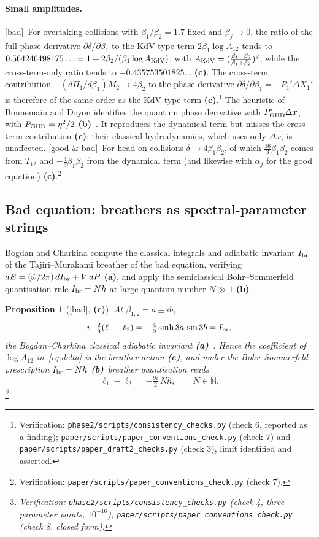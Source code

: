 \documentclass[11pt,a4paper]{article}
\newcommand{\lab}[1]{{\normalfont\sffamily\footnotesize\bfseries(#1)}}
\newcommand{\La}{\lab{a}}
\newcommand{\Lb}{\lab{b}}
\newcommand{\Lc}{\lab{c}}
\newcommand{\eqtag}[2]{{\normalfont\sffamily\footnotesize\textcolor{#1}{[#2]}}}
\newcommand{\Bad}{\eqtag{red!60!black}{bad}}
\newcommand{\Both}{\eqtag{violet!70!black}{good \& bad}}
\newcommand{\scr}[1]{\nolinkurl{#1}}
\newcommand{\chk}[1]{\footnote{\raggedright Verification: #1.}}
\newcommand{\hb}{\hbar}
\newtheorem{proposition}{Proposition}[section]
\theoremstyle{remark}
\begin{document}
\paragraph{Small amplitudes.} \Bad\ For overtaking collisions with $\beta_1/\beta_2=1.7$ fixed and $\beta_j\to0$, the ratio of the full phase derivative $\partial\delta/\partial\beta_1$ to the KdV-type term $2\beta_1\log A_{12}$ tends to $0.564246498175\ldots=1+2\beta_2/(\beta_1\log A_{\rm KdV})$, with $A_{\rm KdV}=(\frac{\beta_1-\beta_2}{\beta_1+\beta_2})^2$, while the cross-term-only ratio tends to $-0.435753501825\ldots$ \Lc. The cross-term contribution $-(d\Pi_1/d\beta_1)M_2\to4\beta_2$ to the phase derivative $\partial\delta/\partial\beta_1=-P_1'\Delta X_1'$ is therefore of the same order as the KdV-type term \Lc.\chk{\scr{phase2/scripts/consistency_checks.py} (check 6, reported as a finding); \scr{paper/scripts/paper_conventions_check.py} (check 7) and \scr{paper/scripts/paper_draft2_checks.py} (check 3), limit identified and asserted} The heuristic of Bonnemain and Doyon identifies the quantum phase derivative with $P'_{\rm GHD}\Delta x$, with $P_{\rm GHD}=\eta^2/2$ \Lb~\cite{BD}. It reproduces the dynamical term but misses the cross-term contribution \Lc; their classical hydrodynamics, which uses only $\Delta x$, is unaffected. \Both\ For head-on collisions $\delta\to4\beta_1\beta_2$, of which $\tfrac{16}3\beta_1\beta_2$ comes from $T_{12}$ and $-\tfrac43\beta_1\beta_2$ from the dynamical term (and likewise with $\alpha_j$ for the good equation) \Lc.\chk{\scr{paper/scripts/paper_conventions_check.py} (check 7)}

\subsection{Bad equation: breathers as spectral-parameter strings}\label{sec:BC}

Bogdan and Charkina compute the classical integrals and adiabatic invariant $I_{\rm br}$ of the Tajiri--Murakami breather of the bad equation, verifying $dE=(\tilde\omega/2\pi)\,dI_{\rm br}+V\,dP$ \La, and apply the semiclassical Bohr--Sommerfeld quantisation rule $I_{\rm br}=N\hb$ at large quantum number $N\gg1$ \Lb~\cite[(64)--(71)]{BC}.

\begin{proposition}[\Bad, \Lc]\label{prop:breather}
At $\beta_{1,2}=a\pm ib$,
\begin{equation}\label{eq:Ibr}
i\cdot\tfrac29(\ell_1-\ell_2)=-\tfrac49\sinh3a\,\sin3b=I_{\rm br},
\end{equation}
the Bogdan--Charkina classical adiabatic invariant \La~\cite[(64)]{BC}. Hence the coefficient of $\log A_{12}$ in~\eqref{eq:delta} is the breather action \Lc, and under the Bohr--Sommerfeld prescription $I_{\rm br}=N\hb$ \Lb\ breather quantisation reads
\begin{equation}\label{eq:string}
\ell_1-\ell_2=-\tfrac{9i}2\,N\hb,\qquad N\in\mathbb N .
\end{equation}
\chk{\scr{phase2/scripts/consistency_checks.py} (check 4, three parameter points, $10^{-16}$); \scr{paper/scripts/paper_conventions_check.py} (check 8, closed form)}
\end{proposition}
\end{document}
